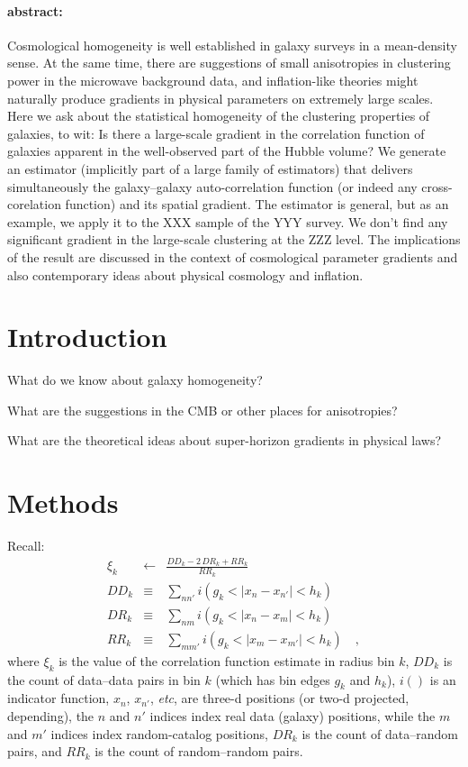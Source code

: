 \documentclass[12pt, letterpaper]{article}
\newcommand{\foreign}[1]{\textsl{#1}}
\newcommand{\etc}{\foreign{etc}}
\begin{document}
\paragraph{abstract:}
Cosmological homogeneity is well established in galaxy surveys in a mean-density
sense.
At the same time, there are suggestions of small anisotropies in clustering power in
the microwave background data, and inflation-like theories might naturally produce
gradients in physical parameters on extremely large scales.
Here we ask about the statistical homogeneity of the clustering properties of galaxies,
to wit:
Is there a large-scale gradient in the correlation function of galaxies
apparent in the well-observed part of the Hubble volume?
We generate an estimator (implicitly part of a large family of estimators)
that delivers simultaneously the galaxy--galaxy auto-correlation function
(or indeed any cross-corelation function)
and its spatial gradient.
The estimator is general, but as an example,
we apply it to the XXX sample of the YYY survey.
We don't find any significant gradient in the large-scale clustering at the ZZZ level.
The implications of the result are discussed in the context of cosmological parameter
gradients and also contemporary ideas about physical cosmology and inflation.

\section{Introduction}

What do we know about galaxy homogeneity?

What are the suggestions in the CMB or other places for anisotropies?

What are the theoretical ideas about super-horizon gradients in physical laws?

\section{Methods}

Recall:
\begin{eqnarray}\displaystyle
\xi_k &\leftarrow& \frac{DD_k - 2\,DR_k + RR_k}{RR_k}
\\
DD_k &\equiv& \sum_{n n'} i(g_k < |x_n - x_{n'}| < h_k)
\\
DR_k &\equiv& \sum_{n m} i(g_k < |x_n - x_m| < h_k)
\\
RR_k &\equiv& \sum_{m m'} i(g_k < |x_m - x_{m'}| < h_k)
\quad ,
\end{eqnarray}
where
$\xi_k$ is the value of the correlation function estimate in radius bin $k$,
$DD_k$ is the count of data--data pairs in bin $k$
(which has bin edges $g_k$ and $h_k$),
$i()$ is an indicator function,
$x_n$, $x_{n'}$, \etc, are three-d positions (or two-d projected, depending),
the $n$ and $n'$ indices index real data (galaxy) positions, while the $m$ and $m'$
indices index random-catalog positions,
$DR_k$ is the count of data--random pairs,
and
$RR_k$ is the count of random--random pairs.
\end{document}

